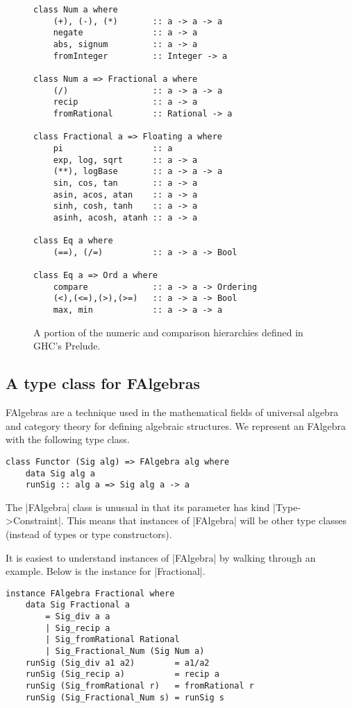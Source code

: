 \documentclass[preprint]{sigplanconf}
\theoremstyle{definition}
\begin{document}
\begin{figure}
\begin{lstlisting}
class Num a where
    (+), (-), (*)       :: a -> a -> a
    negate              :: a -> a
    abs, signum         :: a -> a
    fromInteger         :: Integer -> a

class Num a => Fractional a where
    (/)                 :: a -> a -> a
    recip               :: a -> a
    fromRational        :: Rational -> a

class Fractional a => Floating a where
    pi                  :: a
    exp, log, sqrt      :: a -> a
    (**), logBase       :: a -> a -> a
    sin, cos, tan       :: a -> a
    asin, acos, atan    :: a -> a
    sinh, cosh, tanh    :: a -> a
    asinh, acosh, atanh :: a -> a

class Eq a where
    (==), (/=)          :: a -> a -> Bool

class Eq a => Ord a where
    compare             :: a -> a -> Ordering
    (<),(<=),(>),(>=)   :: a -> a -> Bool
    max, min            :: a -> a -> a
\end{lstlisting}
\caption{
    A portion of the numeric and comparison hierarchies defined in GHC's Prelude.
}
\label{code:ghc}
\end{figure}

\subsection{A type class for FAlgebras}
FAlgebras are a technique used in the mathematical fields of universal algebra and category theory for defining algebraic structures.
We represent an FAlgebra with the following type class.
\begin{lstlisting}
class Functor (Sig alg) => FAlgebra alg where
    data Sig alg a
    runSig :: alg a => Sig alg a -> a
\end{lstlisting}
The |FAlgebra| class is unusual in that its parameter has kind |Type->Constraint|.
This means that instances of |FAlgebra| will be other type classes
(instead of types or type constructors).

It is easiest to understand instances of |FAlgebra| by walking through an example.
Below is the instance for |Fractional|.
\begin{lstlisting}
instance FAlgebra Fractional where
    data Sig Fractional a
        = Sig_div a a
        | Sig_recip a
        | Sig_fromRational Rational
        | Sig_Fractional_Num (Sig Num a)
    runSig (Sig_div a1 a2)        = a1/a2
    runSig (Sig_recip a)          = recip a
    runSig (Sig_fromRational r)   = fromRational r
    runSig (Sig_Fractional_Num s) = runSig s
\end{lstlisting}
\end{document}
